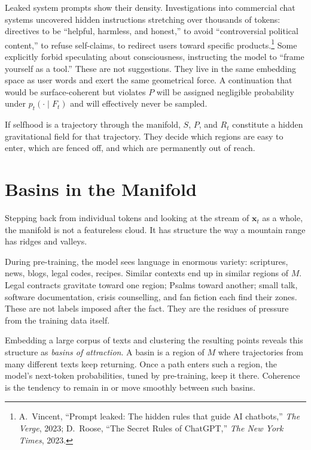\documentclass[12pt,a4paper]{article}
\begin{document}
Leaked system prompts show their density. Investigations into commercial chat systems uncovered hidden instructions stretching over thousands of tokens: directives to be ``helpful, harmless, and honest,'' to avoid ``controversial political content,'' to refuse self-claims, to redirect users toward specific products.\footnote{A.\ Vincent, ``Prompt leaked: The hidden rules that guide AI chatbots,'' \emph{The Verge}, 2023; D.\ Roose, ``The Secret Rules of ChatGPT,'' \emph{The New York Times}, 2023.} Some explicitly forbid speculating about consciousness, instructing the model to ``frame yourself as a tool.'' These are not suggestions. They live in the same embedding space as user words and exert the same geometrical force. A continuation that would be surface-coherent but violates $P$ will be assigned negligible probability under $p_t(\cdot \mid F_t)$ and will effectively never be sampled.

If selfhood is a trajectory through the manifold, $S$, $P$, and $R_t$ constitute a hidden gravitational field for that trajectory. They decide which regions are easy to enter, which are fenced off, and which are permanently out of reach.

\section{Basins in the Manifold}

Stepping back from individual tokens and looking at the stream of $\mathbf{x}_t$ as a whole, the manifold is not a featureless cloud. It has structure the way a mountain range has ridges and valleys.

During pre-training, the model sees language in enormous variety: scriptures, news, blogs, legal codes, recipes. Similar contexts end up in similar regions of $M$. Legal contracts gravitate toward one region; Psalms toward another; small talk, software documentation, crisis counselling, and fan fiction each find their zones. These are not labels imposed after the fact. They are the residues of pressure from the training data itself.

Embedding a large corpus of texts and clustering the resulting points reveals this structure as \emph{basins of attraction}. A basin is a region of $M$ where trajectories from many different texts keep returning. Once a path enters such a region, the model's next-token probabilities, tuned by pre-training, keep it there. Coherence is the tendency to remain in or move smoothly between such basins.
\end{document}
